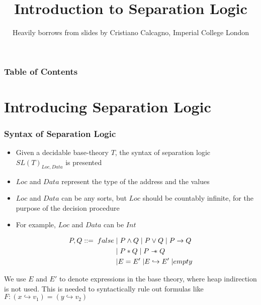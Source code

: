 \documentclass{beamer}
\title %
{Introduction to Separation Logic}
\author[\footnote{Heavily}]%
{Heavily borrows from slides by Cristiano Calcagno, Imperial College London}
\newcommand\sepimp{\mathrel{-\mkern-6mu*}}
\begin{document}
\frame{\titlepage}



\begin{frame}
\frametitle{Table of Contents}
\tableofcontents
\end{frame}


\section{Introducing Separation Logic}

\begin{frame}
\frametitle{Syntax of Separation Logic}
\begin{itemize}
\item Given a decidable base-theory $T$, the syntax of separation logic $SL(T)_{Loc,Data}$ is presented
\item $Loc$ and $Data$ represent the type of the address and the values

\item $Loc$ and $Data$ can be any sorts, but $Loc$ should be countably
    infinite, for the purpose of the decision procedure
\item For example, $Loc$ and $Data$ can be $Int$
\end{itemize}

\begin{align*}
    P,Q ::= \; false \;
          & \lvert \; P \land Q \;
          \lvert \; P \lor Q \;
          \lvert \; P \to Q \\
          & \lvert \; P * Q \;
            \lvert \; P \sepimp Q \\
          & \lvert E = E' \;
            \lvert E \hookrightarrow E' \;
            \lvert empty
\end{align*}

We use $E$ and $E'$ to denote expressions in the base theory,
where heap indirection is not used. This is needed to syntactically
rule out formulas like $F : (x \hookrightarrow v_1) = (y \hookrightarrow v_2)$
\end{frame}
\end{document}
